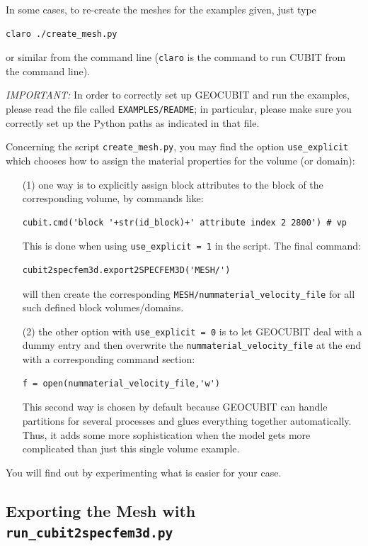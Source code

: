 In some cases, to re-create the meshes for the examples given, just type
\begin{verbatim}
claro ./create_mesh.py
\end{verbatim}
or similar from the command line (\texttt{claro} is the command to run CUBIT from the command line).

{\it IMPORTANT:} In order to correctly set up GEOCUBIT and run the examples, please read the file called \texttt{EXAMPLES/README};
in particular, please make sure you correctly set up the Python paths as indicated in that file.

Concerning the script \texttt{create\_mesh.py}, you may find the option \texttt{use\_explicit} which chooses how to assign the material properties for the volume (or domain):
\begin{itemize}
\item[(1)] one way is to explicitly assign block attributes to the block of the corresponding volume, by commands like:
\begin{verbatim}
cubit.cmd('block '+str(id_block)+' attribute index 2 2800') # vp
\end{verbatim}
This is done when using \texttt{use\_explicit = 1} in the script. The final command:
\begin{verbatim}
cubit2specfem3d.export2SPECFEM3D('MESH/')
\end{verbatim}
will then create the corresponding \texttt{MESH/nummaterial\_velocity\_file} for all such defined block volumes/domains.

\item[(2)] the other option with \texttt{use\_explicit = 0} is to let GEOCUBIT deal with a dummy entry and then overwrite the \texttt{nummaterial\_velocity\_file} at the end with a corresponding command section:
\begin{verbatim}
f = open(nummaterial_velocity_file,'w')
\end{verbatim}
This second way is chosen by default because GEOCUBIT can handle partitions for several processes and glues everything together automatically. Thus, it adds some more sophistication when the model gets more complicated than just this single volume example.
\end{itemize}
You will find out by experimenting what is easier for your case.


\subsection{Exporting the Mesh with \texttt{run\_cubit2specfem3d.py} }\label{subsec:Exporting-the-Mesh}

